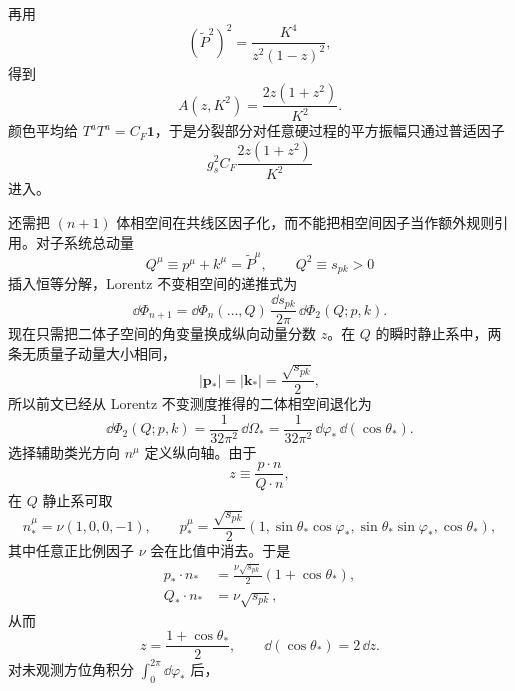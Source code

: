 \begin{derivation}[夸克共线发射的分裂概率]
再用
\begin{equation*}
 (\widetilde P^2)^2
 =\frac{K^4}{z^2(1-z)^2},
\end{equation*}
得到
\begin{equation*}
 A(z,K^2)
 =\frac{2z(1+z^2)}{K^2}.
\end{equation*}
颜色平均给 $T^aT^a=C_F\mathbf1$，于是分裂部分对任意硬过程的平方振幅只通过普适因子
\begin{equation*}
 g_s^2C_F\frac{2z(1+z^2)}{K^2}
\end{equation*}
进入。

还需把 $(n+1)$ 体相空间在共线区因子化，而不能把相空间因子当作额外规则引用。对子系统总动量
\begin{equation*}
 Q^\mu\equiv p^\mu+k^\mu=\widetilde P^\mu,
 \qquad Q^2\equiv s_{pk}>0
\end{equation*}
插入恒等分解，Lorentz 不变相空间的递推式为
\begin{equation*}
 \dd\Phi_{n+1}
 =\dd\Phi_n(\ldots,Q)\,
 \frac{\dd s_{pk}}{2\pi}\,
 \dd\Phi_2(Q;p,k).
\end{equation*}
现在只需把二体子空间的角变量换成纵向动量分数 $z$。在 $Q$ 的瞬时静止系中，两条无质量子动量大小相同，
\begin{equation*}
 |\mathbf p_*|=|\mathbf k_*|=\frac{\sqrt{s_{pk}}}{2},
\end{equation*}
所以前文已经从 Lorentz 不变测度推得的二体相空间退化为
\begin{equation*}
 \dd\Phi_2(Q;p,k)
 =\frac{1}{32\pi^2}\,\dd\Omega_*
 =\frac{1}{32\pi^2}\,\dd\varphi_*\,\dd(\cos\theta_*).
\end{equation*}
选择辅助类光方向 $n^\mu$ 定义纵向轴。由于
\begin{equation*}
 z\equiv\frac{p\cdot n}{Q\cdot n},
\end{equation*}
在 $Q$ 静止系可取
\begin{equation*}
 n_*^\mu=\nu(1,0,0,-1),
 \qquad
 p_*^\mu=\frac{\sqrt{s_{pk}}}{2}
 (1,\sin\theta_*\cos\varphi_*,\sin\theta_*\sin\varphi_*,\cos\theta_*),
\end{equation*}
其中任意正比例因子 $\nu$ 会在比值中消去。于是
\begin{align*}
 p_*\cdot n_*
 &=\frac{\nu\sqrt{s_{pk}}}{2}(1+\cos\theta_*),\\
 Q_*\cdot n_*
 &=\nu\sqrt{s_{pk}},
\end{align*}
从而
\begin{equation*}
 z=\frac{1+\cos\theta_*}{2},
 \qquad
 \dd(\cos\theta_*)=2\,\dd z.
\end{equation*}
对未观测方位角积分 $\int_0^{2\pi}\dd\varphi_*$ 后，

\end{derivation}
